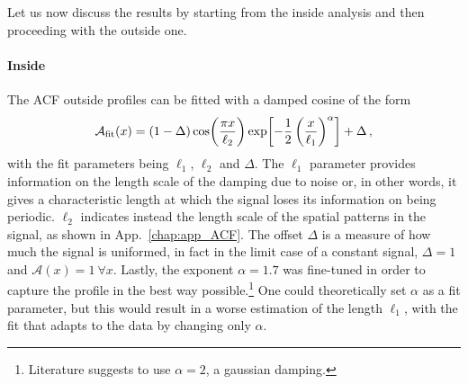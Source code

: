 Let us now discuss the results by starting from the inside analysis and then proceeding with the outside one.

\paragraph{Inside}
The ACF outside profiles can be fitted with a damped cosine of the form
\begin{equation}
    \mathcal{A}_{\rm fit}(x) = (1 - \Delta)\cos(\frac{\pi x}{\ell_2})\exp[-\frac{1}{2}\left(\frac{x}{\ell_1}\right)^\alpha] + \Delta\, ,
    \label{eq:damp}
\end{equation}
with the fit parameters being $\ell_1$, $\ell_2$ and $\Delta$. The $\ell_1$ parameter provides information on the length scale of the damping due to noise or, in other words, it gives a characteristic length at which the signal loses its information on being periodic. $\ell_2$ indicates instead the length scale of the spatial patterns in the signal, as shown in App.\ \ref{chap:app_ACF}. The offset $\Delta$ is a measure of how much the signal is uniformed, in fact in the limit case of a constant signal, $\Delta = 1$ and $\mathcal{A}(x) = 1\ \forall x$.
Lastly, the exponent $\alpha = 1.7$ was fine-tuned in order to capture the profile in the best way possible.\footnote{Literature suggests to use $\alpha = 2$, a gaussian damping.} One could theoretically set $\alpha$ as a fit parameter, but this would result in a worse estimation of the length $\ell_1$, with the fit that adapts to the data by changing only $\alpha$. 

